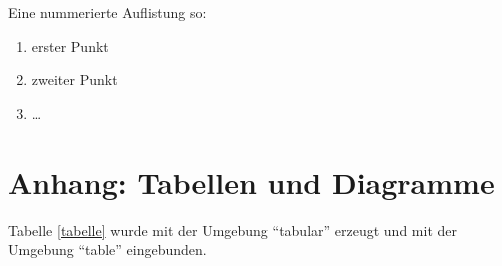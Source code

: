 \documentclass[11pt,a4paper]{article}
\begin{document}
Eine nummerierte Auflistung so: 
\begin{enumerate}
	\item erster Punkt
	\item zweiter Punkt
	\item \dots
\end{enumerate}
	 
	

\section{Anhang: Tabellen und Diagramme}

Tabelle \ref{tabelle} wurde mit der Umgebung "`tabular"' erzeugt
und mit der Umgebung "`table"' eingebunden.  



\end{document}
